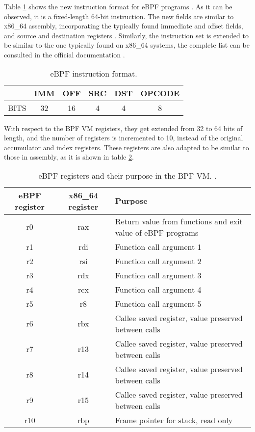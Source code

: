 Table \ref{table:ebpf_inst_format} shows the new instruction format for eBPF programs \cite{ebpf_inst_set}. As it can be observed, it is a fixed-length 64-bit instruction. The new fields are similar to x86\_64 assembly, incorporating the typically found immediate and offset fields, and source and destination registers \cite{8664_inst_set_specs}. Similarly, the instruction set is extended to be similar to the one typically found on x86\_64 systems, the complete list can be consulted in the official documentation \cite{ebpf_inst_set}.

\begin{table}[htbp]
\begin{tabular}{|c|c|c|c|c|c|}
\hline
& IMM & OFF & SRC & DST & OPCODE \\
\hline
BITS & 32 & 16 & 4 & 4 & 8\\
\hline
\end{tabular}
\caption{eBPF instruction format.}
\label{table:ebpf_inst_format}
\end{table}

With respect to the BPF VM registers, they get extended from 32 to 64 bits of length, and the number of registers is incremented to 10, instead of the original accumulator and index registers. These registers are also adapted to be similar to those in assembly, as it is shown in table \ref{table:ebpf_regs}.

\begin{table}[htbp]
\begin{tabular}{|c|c|m{21em}|}
\hline
eBPF register & x86\_64 register & Purpose\\
\hline
r0 & rax & Return value from functions and exit value of eBPF programs\\
r1 & rdi & Function call argument 1\\
r2 & rsi & Function call argument 2\\
r3 & rdx & Function call argument 3\\
r4 & rcx & Function call argument 4\\
r5 & r8 & Function call argument 5\\
r6 & rbx & Callee saved register, value preserved between calls\\
r7 & r13 & Callee saved register, value preserved between calls\\
r8 & r14 & Callee saved register, value preserved between calls\\
r9 & r15 & Callee saved register, value preserved between calls\\
r10 & rbp & Frame pointer for stack, read only\\
\hline
\end{tabular}
\caption{eBPF registers and their purpose in the BPF VM. \cite{ebpf_inst_set} \cite{ebpf_starovo_slides}.}
\label{table:ebpf_regs}
\end{table}

